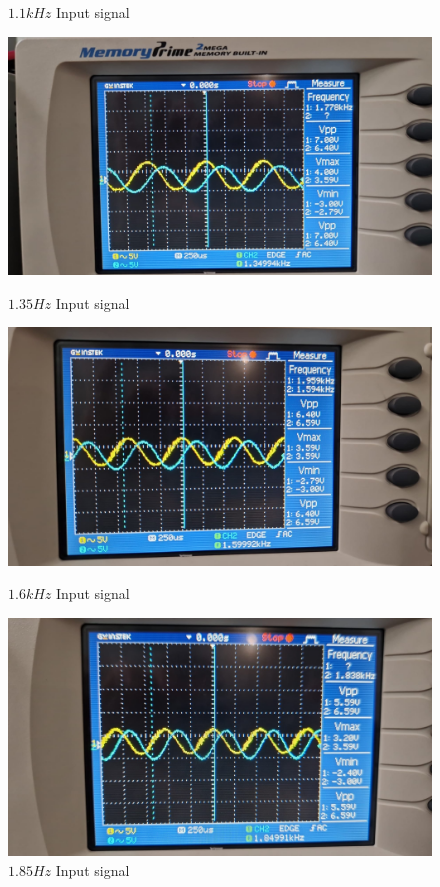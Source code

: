 \begin{figure}[h]
\begin{minipage}{.4\textwidth}
        \caption{$1.1kHz$ Input signal}
        \label{fig:p2-exp-1.1}
    \end{minipage}%
    \begin{minipage}{.4\textwidth}
        \includegraphics[width=1\linewidth]{assets/p2-exp-1.35.png}
        \caption{$1.35Hz$ Input signal}
        \label{fig:p2-exp-1.35}
    \end{minipage}
    \begin{minipage}{.4\textwidth}
        \includegraphics[width=1\linewidth]{assets/p2-exp-1.6.png}
        \caption{$1.6kHz$ Input signal}
        \label{fig:p2-exp-1.6}
    \end{minipage}%
    \begin{minipage}{.4\textwidth}
        \includegraphics[width=1\linewidth]{assets/p2-exp-1.85.png}
        \caption{$1.85Hz$ Input signal}
        \label{fig:p2-exp-1.85}
    \end{minipage}
\end{figure}

